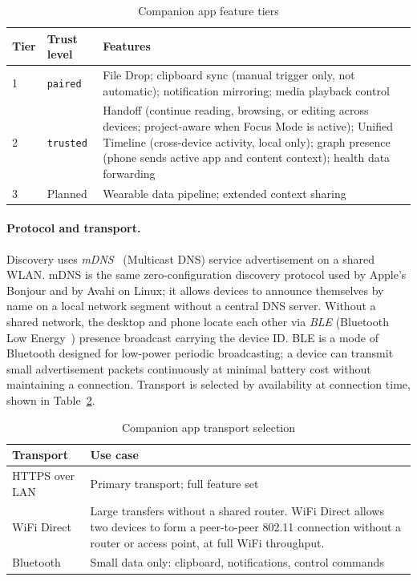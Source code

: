 \begin{table}[htbp]
\caption{Companion app feature tiers}
\label{tab:companion-tiers}
\begin{tabularx}{\linewidth}{llX}
\toprule
\textbf{Tier} & \textbf{Trust level} & \textbf{Features} \\
\midrule
1 & \texttt{paired}  &
  File Drop; clipboard sync (manual trigger only, not automatic);
  notification mirroring; media playback control \\
2 & \texttt{trusted} &
  Handoff (continue reading, browsing, or editing across devices;
  project-aware when Focus Mode is active);
  Unified Timeline (cross-device activity, local only);
  graph presence (phone sends active app and content context);
  health data forwarding \\
3 & Planned          &
  Wearable data pipeline; extended context sharing \\
\bottomrule
\end{tabularx}
\end{table}

\paragraph{Protocol and transport.}
Discovery uses \emph{mDNS}~\cite{rfc6762} (Multicast DNS) service
advertisement on a shared WLAN. mDNS is the same zero-configuration discovery
protocol used by Apple's Bonjour and by Avahi on Linux; it allows devices to
announce themselves by name on a local network segment without a central DNS
server. Without a shared network, the desktop and phone locate each other via
\emph{BLE} (Bluetooth Low Energy~\cite{archwiki:bluetooth}) presence broadcast
carrying the device ID. BLE is a mode of Bluetooth designed for low-power
periodic broadcasting; a device can transmit small advertisement packets
continuously at minimal battery cost without maintaining a connection. Transport is selected by availability at connection
time, shown in Table~\ref{tab:companion-transport}.

\begin{table}[htbp]
\caption{Companion app transport selection}
\label{tab:companion-transport}
\begin{tabularx}{\linewidth}{lX}
\toprule
\textbf{Transport} & \textbf{Use case} \\
\midrule
HTTPS over LAN  & Primary transport; full feature set \\
WiFi Direct~\cite{wifidirect} & Large transfers without a shared router.
  WiFi Direct allows two devices to form a peer-to-peer 802.11 connection
  without a router or access point, at full WiFi throughput. \\
Bluetooth       & Small data only: clipboard, notifications, control commands \\
\bottomrule
\end{tabularx}
\end{table}

